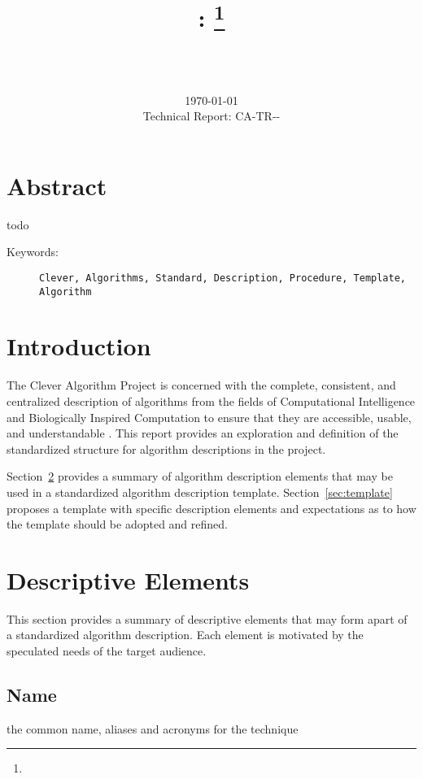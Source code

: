 \documentclass[a4paper, 11pt]{article}
\title{{\myreporttitle}: {\myreportsubtitle}\footnote{\myreportlicense}}
\author{\myreportauthor\\{\myreportemail}\\\small\myreportproject}
\date{\today\\{\small{Technical Report: CA-TR-{\myreportdate}-\myreportversion}}}
\begin{document}
\maketitle

\section*{Abstract} 
todo

\begin{description}
	\item[Keywords:] {\small\texttt{Clever, Algorithms, Standard, Description, Procedure, Template, Algorithm}}
\end{description} 

\section{Introduction}
\label{sec:introduction}
The Clever Algorithm Project is concerned with the complete, consistent, and centralized description of algorithms from the fields of Computational Intelligence and Biologically Inspired Computation to ensure that they are accessible, usable, and understandable \cite{Brownlee2010}.
This report provides an exploration and definition of the standardized structure for algorithm descriptions in the project.

Section~\ref{sec:elements} provides a summary of algorithm description elements that may be used in a standardized algorithm description template. Section~\ref{sec:template} proposes a template with specific description elements and expectations as to how the template should be adopted and refined.

\section{Descriptive Elements}
\label{sec:elements}
This section provides a summary of descriptive elements that may form apart of a standardized algorithm description. Each element is motivated by the speculated needs of the target audience.

\subsection{Name}
the common name, aliases and acronyms for the technique 
\end{document}

